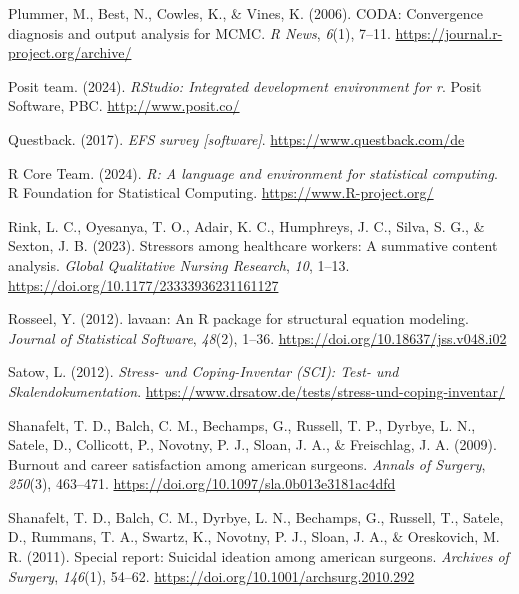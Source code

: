 \documentclass[
  man]{apa6}
\newlength{\cslhangindent}
\newenvironment{CSLReferences}[2] %
 {\begin{list}{}{%
  \setlength{\itemindent}{0pt}
  \setlength{\leftmargin}{0pt}
  \setlength{\parsep}{0pt}
  \ifodd #1
   \setlength{\leftmargin}{\cslhangindent}
   \setlength{\itemindent}{-1\cslhangindent}
  \fi
  \setlength{\itemsep}{#2\baselineskip}}}
 {\end{list}}
\begin{document}
\begin{CSLReferences}{1}{0}
Plummer, M., Best, N., Cowles, K., \& Vines, K. (2006). CODA: Convergence diagnosis and output analysis for MCMC. \emph{R News}, \emph{6}(1), 7--11. \url{https://journal.r-project.org/archive/}

Posit team. (2024). \emph{RStudio: Integrated development environment for r}. Posit Software, PBC. \url{http://www.posit.co/}

Questback. (2017). \emph{EFS survey {[}software{]}}. \url{https://www.questback.com/de}

R Core Team. (2024). \emph{R: A language and environment for statistical computing}. R Foundation for Statistical Computing. \url{https://www.R-project.org/}

Rink, L. C., Oyesanya, T. O., Adair, K. C., Humphreys, J. C., Silva, S. G., \& Sexton, J. B. (2023). Stressors among healthcare workers: A summative content analysis. \emph{Global Qualitative Nursing Research}, \emph{10}, 1--13. \url{https://doi.org/10.1177/23333936231161127}

Rosseel, Y. (2012). {lavaan}: An {R} package for structural equation modeling. \emph{Journal of Statistical Software}, \emph{48}(2), 1--36. \url{https://doi.org/10.18637/jss.v048.i02}

Satow, L. (2012). \emph{{Stress- und Coping-Inventar (SCI): Test- und Skalendokumentation}}. \url{https://www.drsatow.de/tests/stress-und-coping-inventar/}

Shanafelt, T. D., Balch, C. M., Bechamps, G., Russell, T. P., Dyrbye, L. N., Satele, D., Collicott, P., Novotny, P. J., Sloan, J. A., \& Freischlag, J. A. (2009). Burnout and career satisfaction among american surgeons. \emph{Annals of Surgery}, \emph{250}(3), 463--471. \url{https://doi.org/10.1097/sla.0b013e3181ac4dfd}

Shanafelt, T. D., Balch, C. M., Dyrbye, L. N., Bechamps, G., Russell, T., Satele, D., Rummans, T. A., Swartz, K., Novotny, P. J., Sloan, J. A., \& Oreskovich, M. R. (2011). Special report: Suicidal ideation among american surgeons. \emph{Archives of Surgery}, \emph{146}(1), 54--62. \url{https://doi.org/10.1001/archsurg.2010.292}


\end{CSLReferences}
\end{document}
